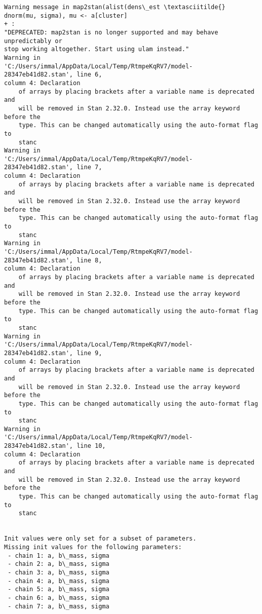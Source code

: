 \documentclass[11pt]{article}
\begin{document}
    \begin{Verbatim}[commandchars=\\\{\}]
Warning message in map2stan(alist(dens\_est \textasciitilde{} dnorm(mu, sigma), mu <- a[cluster]
+ :
"DEPRECATED: map2stan is no longer supported and may behave unpredictably or
stop working altogether. Start using ulam instead."
Warning in
'C:/Users/immal/AppData/Local/Temp/RtmpeKqRV7/model-28347eb41d82.stan', line 6,
column 4: Declaration
    of arrays by placing brackets after a variable name is deprecated and
    will be removed in Stan 2.32.0. Instead use the array keyword before the
    type. This can be changed automatically using the auto-format flag to
    stanc
Warning in
'C:/Users/immal/AppData/Local/Temp/RtmpeKqRV7/model-28347eb41d82.stan', line 7,
column 4: Declaration
    of arrays by placing brackets after a variable name is deprecated and
    will be removed in Stan 2.32.0. Instead use the array keyword before the
    type. This can be changed automatically using the auto-format flag to
    stanc
Warning in
'C:/Users/immal/AppData/Local/Temp/RtmpeKqRV7/model-28347eb41d82.stan', line 8,
column 4: Declaration
    of arrays by placing brackets after a variable name is deprecated and
    will be removed in Stan 2.32.0. Instead use the array keyword before the
    type. This can be changed automatically using the auto-format flag to
    stanc
Warning in
'C:/Users/immal/AppData/Local/Temp/RtmpeKqRV7/model-28347eb41d82.stan', line 9,
column 4: Declaration
    of arrays by placing brackets after a variable name is deprecated and
    will be removed in Stan 2.32.0. Instead use the array keyword before the
    type. This can be changed automatically using the auto-format flag to
    stanc
Warning in
'C:/Users/immal/AppData/Local/Temp/RtmpeKqRV7/model-28347eb41d82.stan', line 10,
column 4: Declaration
    of arrays by placing brackets after a variable name is deprecated and
    will be removed in Stan 2.32.0. Instead use the array keyword before the
    type. This can be changed automatically using the auto-format flag to
    stanc


Init values were only set for a subset of parameters.
Missing init values for the following parameters:
 - chain 1: a, b\_mass, sigma
 - chain 2: a, b\_mass, sigma
 - chain 3: a, b\_mass, sigma
 - chain 4: a, b\_mass, sigma
 - chain 5: a, b\_mass, sigma
 - chain 6: a, b\_mass, sigma
 - chain 7: a, b\_mass, sigma


    \end{Verbatim}
\end{document}
